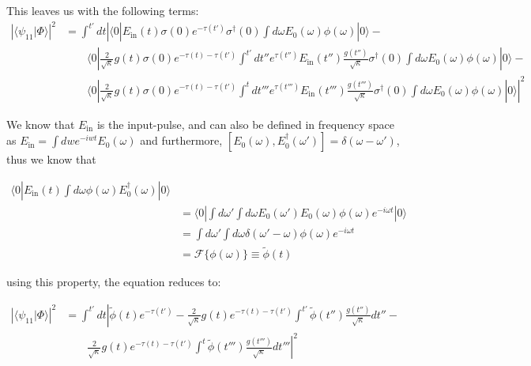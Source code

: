 \documentclass[12pt]{article}
\begin{document}
This leaves us with the following terms:
\begin{align}
\left | \langle \psi_{11} | \Phi \rangle \right | ^2 &= \int^{t'} dt \left | \langle 0 | E_\textrm{in}(t) \sigma(0) e^{-\tau(t')}
\sigma^\dagger(0) \int d\omega E_0(\omega) \phi(\omega) | 0 \rangle -\right. \\
&\qquad  \langle 0 | \frac{2}{\sqrt{\kappa}} g(t) \sigma(0) e^{-\tau(t) -\tau(t')}
\int^{t'} dt'' e^{\tau(t'')} E_\textrm{in}(t'')\frac{g(t'')}{\sqrt{\kappa}} \sigma^\dagger(0) \int d\omega E_0(\omega) \phi(\omega) | 0 \rangle - \\
& \qquad \left. \langle 0 | \frac{2}{\sqrt{\kappa}} g(t) \sigma(0) e^{-\tau(t) -\tau(t')}
\int^{t} dt''' e^{\tau(t''')} E_\textrm{in}(t''')\frac{g(t''')}{\sqrt{\kappa}} \sigma^\dagger(0) \int d\omega E_0(\omega) \phi(\omega) | 0 \rangle \right |^2
\end{align}


We know that $E_\textrm{in}$ is the input-pulse, and can also be defined in frequency space as $E_\textrm{in} = \int dw e^{-iwt} E_0(\omega) $ and furthermore, $[E_0(\omega), E_0^\dagger(\omega') ] = \delta(\omega-\omega')$, thus we know that 

\begin{align}
\langle 0 |E_\textrm{in}(t) \int d\omega \phi(\omega) E^\dagger_0(\omega) | 0 \rangle\\
&= \langle 0 | \int d \omega' \int d \omega E_0(\omega') E_0(\omega) \phi(\omega) e^{-i\omega t} |0\rangle\\
&=\int d \omega' \int d \omega \delta(\omega'-\omega) \phi(\omega) e^{-i\omega t}\\ 
&= \mathscr{F}\{\phi(\omega)\} \equiv \tilde{\phi}(t)
\end{align}

using this property, the equation reduces to:

\begin{align}
\left | \langle \psi_{11} | \Phi \rangle \right | ^2 &= \int^{t'} dt\left| \tilde{\phi}(t)e^{-\tau(t')} -\frac{2}{\sqrt{\kappa}} g(t) e^{-\tau(t)-\tau(t')} \int^{t'} \tilde{\phi}(t'')\frac{g(t'')}{\sqrt{\kappa}} dt'' - \right.\\
&\left. \qquad \frac{2}{\sqrt{\kappa}} g(t) e^{-\tau(t)-\tau(t')} \int^t \tilde{\phi}(t''')\frac{g(t''')}{\sqrt{\kappa}} dt''' \right |^2 
\end{align}
\end{document}
